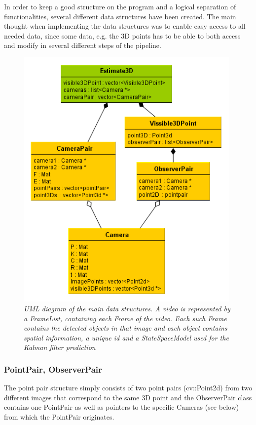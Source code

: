 In order to keep a good structure on the program and a logical separation of functionalities, several different data structures have been created. The main thought when implementing the data structures was to enable easy access to all needed data, since some data, e.g. the 3D points has to be able to both access and modify in several different steps of the pipeline.

\begin{figure}[htb]
	\centering
	\includegraphics[width=110mm]{images/data_structures_uml.png}
	\caption{\textit{UML diagram of the main data structures. A video is represented by a FrameList, containing each Frame of the video. Each such Frame contains the detected objects in that image and each object contains spatial information, a unique id and a StateSpaceModel used for the Kalman filter prediction}}
	\label{fig:UML_fig} %
\end{figure}



\subsubsection{PointPair, ObserverPair}
The point pair structure simply consists of two point pairs (cv::Point2d) from two different images that correspond to the same 3D point and the ObserverPair class contains one PointPair as well as pointers to the specific Cameras (see below) from which the PointPair originates. 


